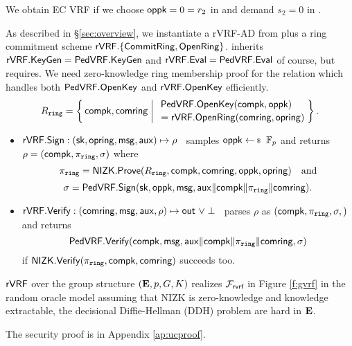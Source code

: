\noindent We obtain EC VRF if we choose $\mathsf{oppk} = 0 = r_2$ in \Sign and demand $s_2 = 0$ in \Verify.
%

\smallskip

As described in \S\ref{sec:overview},
we instantiate a rVRF-AD from \PedVRF plus a ring commitment scheme
 ${\mathsf{rVRF}}.\{ {\mathsf{CommitRing}}, {\mathsf{OpenRing}} \}$.
\rVRF inherits ${\mathsf{rVRF}}.{\mathsf{KeyGen}} = {\mathsf{PedVRF}}.{\mathsf{KeyGen}}$ and
 ${\mathsf{rVRF}}.{\mathsf{Eval}} = {\mathsf{PedVRF}}.{\mathsf{Eval}}$ of course, but requires.
We need zero-knowledge ring membership proof for the relation \Rring
which handles both ${\mathsf{PedVRF}}.{\mathsf{OpenKey}}$ and ${\mathsf{rVRF}}.{\mathsf{OpenKey}}$ efficiently.
$$ \Rring = \Setst{ \compk, \comring }{
    \eprint{ \exists \openpk,\openring \textrm{\ s.t.\ } }{}
    \genfrac{}{}{0pt}{}{\PedVRF.\OpenKey(\compk,\openpk) \quad}{\,\, = \rVRF.\OpenRing(\comring,\openring)}
} \mathperiod $$

\begin{itemize}
\item ${\mathsf{rVRF}}.{\mathsf{Sign}} : (\mathsf{sk},\mathsf{opring},\mathsf{msg},\mathsf{aux}) \mapsto \rho$ \,
 samples $\openpk \leftsample \F_p$ and
 returns $\rho = (\mathsf{compk},\pi_{\mathtt{ring}},\sigma)$ where      %
 $$ \pi_{\mathtt{ring}} = {\mathsf{NIZK}}.{\mathsf{Prove}}(R_{\mathtt{ring}},\mathsf{compk},\mathsf{comring},\mathsf{oppk},\mathsf{opring}) \quad\textrm{and} $$
 $$ \sigma = {\mathsf{PedVRF}}.{\mathsf{Sign}}(\mathsf{sk},\mathsf{oppk},\mathsf{msg},\mathsf{aux} \| \mathsf{compk} \| \pi_{\mathtt{ring}} \| \mathsf{comring}) . $$ %
\item ${\mathsf{rVRF}}.{\mathsf{Verify}} : (\mathsf{comring},\mathsf{msg},\mathsf{aux},\rho) \mapsto {\ensuremath{\mathsf{out}}} \,\, \lor \perp$ \,
 parses $\rho$ as $(\mathsf{compk},\pi_{\mathtt{ring}},\sigma,)$ and returns
 $$ {\mathsf{PedVRF}}.{\mathsf{Verify}}(\mathsf{compk},\mathsf{msg},\mathsf{aux} \| \mathsf{compk} \| \pi_{\mathtt{ring}} \| \mathsf{comring},\sigma) $$
 if ${\mathsf{NIZK}}.{\mathsf{Verify}}(\pi_{\mathtt{ring}},\mathsf{compk},\mathsf{comring})$ succeeds too.
\end{itemize}

	\begin{theorem}\label{thm:rvrf}
	$ {\mathsf{rVRF}} $  over the group structure $ ({\mathbf{E}},p,G,K) $ realizes $ \mathcal{F}_{\textsf{rvrf}} $ in Figure \ref{f:gvrf} in the random oracle model assuming that NIZK is zero-knowledge and knowledge extractable, the decisional Diffie-Hellman (DDH) problem are hard in $ {\mathbf{E}}  $. 
\end{theorem}
The security proof is in Appendix \ref{ap:ucproof}.






